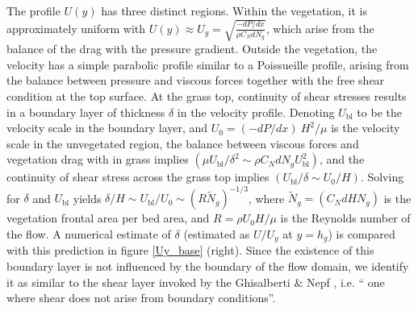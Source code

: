 \documentclass[12pt]{report}   %
\newcommand{\hg}{h_g}
\newcommand{\Rey}{{R}}
\newcommand{\Ndg}{\tilde{N}_g}
\newcommand{\ubl}{U_\text{bl}}
\begin{document}
The profile $U(y)$ has three distinct regions.
Within the vegetation, it is approximately uniform with $ U(y) \approx U_g = \sqrt{\frac{-dP/dx}{\rho C_N dN_g}}$, which arise from the balance of the drag with the pressure gradient. 
Outside the vegetation, the velocity has a simple parabolic profile similar to a Poissueille profile, arising from the balance between pressure and viscous forces together with the free shear condition at the top surface. 
At the grass top, continuity of shear stresses results in a boundary layer of thickness $\delta$ in the velocity profile. Denoting $\ubl$ to be the velocity scale in the boundary layer, and $U_0 = {(-dP/dx)~H^2}/{\mu}$ is the velocity scale in the unvegetated region, the balance between viscous forces and vegetation drag with in grass implies $(\mu \ubl/\delta^2 \sim \rho C_N d N_g \ubl^2)$, and the continuity of shear stress across the grass top implies $(\ubl/\delta \sim U_0/H)$.
Solving for $\delta$ and $\ubl$ yields $\delta/H \sim \ubl/U_0 \sim (\Rey \Ndg )^{-1/3}$, where $\Ndg = \left(C_N d H N_g\right)$ is the vegetation frontal area per bed area, and $\Rey=\rho U_0 H/\mu$ is the Reynolds number of the flow. 
A numerical estimate of $\delta$ (estimated as $U/U_y$ at $y=\hg$) is compared with this prediction in figure \ref{Uy_base} (right). Since the existence of this boundary layer is not influenced by the boundary of the flow domain, we identify it as similar to the shear layer invoked by the Ghisalberti $\&$ Nepf \cite{Ghisal02,Nepf04}, i.e. `` one where shear does not arise from boundary conditions''.
\end{document}
